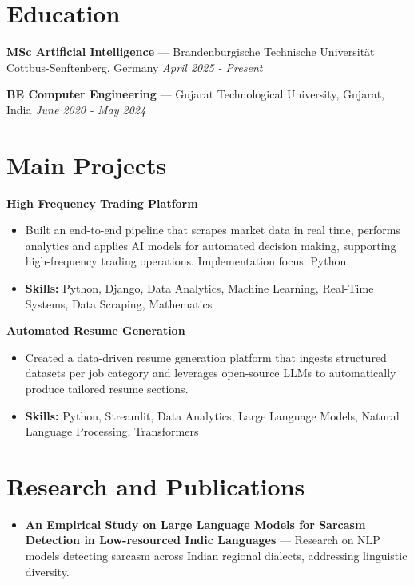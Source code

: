 \documentclass[a4paper,10pt]{article}
\begin{document}
\section*{Education}
\textbf{MSc Artificial Intelligence} — Brandenburgische Technische Universität Cottbus-Senftenberg, Germany \hfill \textit{April 2025 - Present}\par
\vspace{1.5pt}
\textbf{BE Computer Engineering} — Gujarat Technological University, Gujarat, India \hfill \textit{June 2020 - May 2024}\par

\section*{Main Projects}
\textbf{High Frequency Trading Platform}\par
\vspace{1pt}
\begin{itemize}
  \item Built an end-to-end pipeline that scrapes market data in real time, performs analytics and applies AI models for automated decision making, supporting high-frequency trading operations. Implementation focus: Python.
  \item \textbf{Skills:} Python, Django, Data Analytics, Machine Learning, Real-Time Systems, Data Scraping, Mathematics
\end{itemize}
\vspace{3pt}
\textbf{Automated Resume Generation}\par
\vspace{1pt}
\begin{itemize}
  \item Created a data-driven resume generation platform that ingests structured datasets per job category and leverages open-source LLMs to automatically produce tailored resume sections.
  \item \textbf{Skills:} Python, Streamlit, Data Analytics, Large Language Models, Natural Language Processing, Transformers
\end{itemize}

\section*{Research and Publications}
\begin{itemize}
\item \textbf{An Empirical Study on Large Language Models for Sarcasm Detection in Low-resourced Indic Languages} — Research on NLP models detecting sarcasm across Indian regional dialects, addressing linguistic diversity.
\end{itemize}
\end{document}

